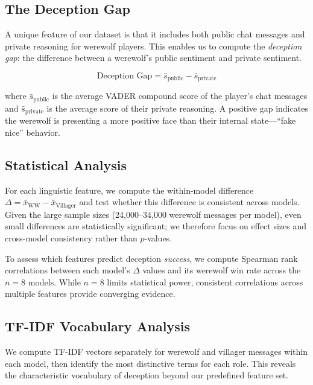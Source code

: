 \subsection{The Deception Gap}

A unique feature of our dataset is that it includes both public chat messages and private reasoning for werewolf players. This enables us to compute the \emph{deception gap}: the difference between a werewolf's public sentiment and private sentiment.

\begin{equation}
\text{Deception Gap} = \bar{s}_{\text{public}} - \bar{s}_{\text{private}}
\end{equation}

where $\bar{s}_{\text{public}}$ is the average VADER compound score of the player's chat messages and $\bar{s}_{\text{private}}$ is the average score of their private reasoning. A positive gap indicates the werewolf is presenting a more positive face than their internal state---``fake nice'' behavior.

\subsection{Statistical Analysis}

For each linguistic feature, we compute the within-model difference $\Delta = \bar{x}_{\text{WW}} - \bar{x}_{\text{Villager}}$ and test whether this difference is consistent across models. Given the large sample sizes (24,000--34,000 werewolf messages per model), even small differences are statistically significant; we therefore focus on effect sizes and cross-model consistency rather than $p$-values.

To assess which features predict deception \emph{success}, we compute Spearman rank correlations between each model's $\Delta$ values and its werewolf win rate across the $n = 8$ models. While $n = 8$ limits statistical power, consistent correlations across multiple features provide converging evidence.

\subsection{TF-IDF Vocabulary Analysis}

We compute TF-IDF vectors separately for werewolf and villager messages within each model, then identify the most distinctive terms for each role. This reveals the characteristic vocabulary of deception beyond our predefined feature set.
